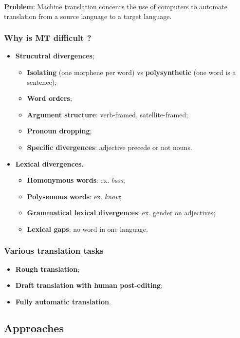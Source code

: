 
\textbf{Problem}: Machine translation concenrs the use of computers to automate translation from a source language to a target language.

\subsubsection{Why is MT difficult ?}

\begin{itemize}
	\item \textbf{Strucutral divergences};
	\begin{itemize}
		\item \textbf{Isolating} (one morphene per word) vs \textbf{polysynthetic} (one word is a sentence);
		\item \textbf{Word orders};
		\item \textbf{Argument structure}: verb-framed, satellite-framed;
		\item \textbf{Pronoun dropping};
		\item \textbf{Specific divergences}: adjective precede or not nouns.
	\end{itemize}
	\item \textbf{Lexical divergences}.
	\begin{itemize}
		\item \textbf{Homonymous words}: ex. \textit{bass};
		\item \textbf{Polysemous words}: ex. \textit{know};
		\item \textbf{Grammatical lexical divergences}: ex. gender on adjectives;
		\item \textbf{Lexical gaps}: no word in one language.
	\end{itemize}
\end{itemize}

\subsubsection{Various translation tasks}

\begin{itemize}
	\item \textbf{Rough translation};
	\item \textbf{Draft translation with human post-editing};
	\item \textbf{Fully automatic translation}.
\end{itemize}

\subsection{Approaches}

